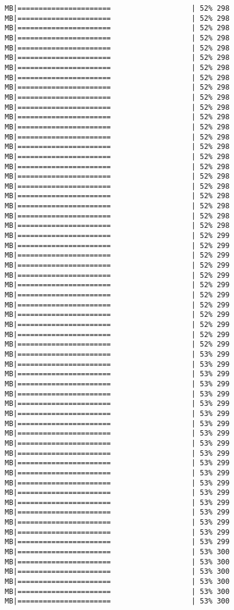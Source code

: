 \documentclass[
]{article}
\begin{document}
\begin{verbatim}
MB|======================                   | 52% 298 MB|======================                   | 52% 298 MB|======================                   | 52% 298 MB|======================                   | 52% 298 MB|======================                   | 52% 298 MB|======================                   | 52% 298 MB|======================                   | 52% 298 MB|======================                   | 52% 298 MB|======================                   | 52% 298 MB|======================                   | 52% 298 MB|======================                   | 52% 298 MB|======================                   | 52% 298 MB|======================                   | 52% 298 MB|======================                   | 52% 298 MB|======================                   | 52% 298 MB|======================                   | 52% 298 MB|======================                   | 52% 298 MB|======================                   | 52% 298 MB|======================                   | 52% 298 MB|======================                   | 52% 298 MB|======================                   | 52% 298 MB|======================                   | 52% 298 MB|======================                   | 52% 298 MB|======================                   | 52% 299 MB|======================                   | 52% 299 MB|======================                   | 52% 299 MB|======================                   | 52% 299 MB|======================                   | 52% 299 MB|======================                   | 52% 299 MB|======================                   | 52% 299 MB|======================                   | 52% 299 MB|======================                   | 52% 299 MB|======================                   | 52% 299 MB|======================                   | 52% 299 MB|======================                   | 52% 299 MB|======================                   | 53% 299 MB|======================                   | 53% 299 MB|======================                   | 53% 299 MB|======================                   | 53% 299 MB|======================                   | 53% 299 MB|======================                   | 53% 299 MB|======================                   | 53% 299 MB|======================                   | 53% 299 MB|======================                   | 53% 299 MB|======================                   | 53% 299 MB|======================                   | 53% 299 MB|======================                   | 53% 299 MB|======================                   | 53% 299 MB|======================                   | 53% 299 MB|======================                   | 53% 299 MB|======================                   | 53% 299 MB|======================                   | 53% 299 MB|======================                   | 53% 299 MB|======================                   | 53% 299 MB|======================                   | 53% 299 MB|======================                   | 53% 300 MB|======================                   | 53% 300 MB|======================                   | 53% 300 MB|======================                   | 53% 300 MB|======================                   | 53% 300 MB|======================                   | 53% 300 
\end{verbatim}
\end{document}

